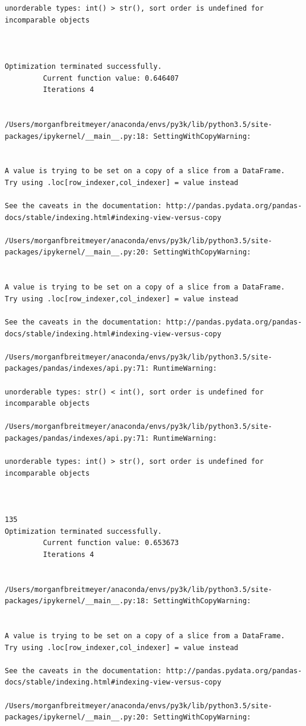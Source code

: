 \begin{lstlisting}
unorderable types: int() > str(), sort order is undefined for incomparable objects



Optimization terminated successfully.
         Current function value: 0.646407
         Iterations 4


/Users/morganfbreitmeyer/anaconda/envs/py3k/lib/python3.5/site-packages/ipykernel/__main__.py:18: SettingWithCopyWarning:


A value is trying to be set on a copy of a slice from a DataFrame.
Try using .loc[row_indexer,col_indexer] = value instead

See the caveats in the documentation: http://pandas.pydata.org/pandas-docs/stable/indexing.html#indexing-view-versus-copy

/Users/morganfbreitmeyer/anaconda/envs/py3k/lib/python3.5/site-packages/ipykernel/__main__.py:20: SettingWithCopyWarning:


A value is trying to be set on a copy of a slice from a DataFrame.
Try using .loc[row_indexer,col_indexer] = value instead

See the caveats in the documentation: http://pandas.pydata.org/pandas-docs/stable/indexing.html#indexing-view-versus-copy

/Users/morganfbreitmeyer/anaconda/envs/py3k/lib/python3.5/site-packages/pandas/indexes/api.py:71: RuntimeWarning:

unorderable types: str() < int(), sort order is undefined for incomparable objects

/Users/morganfbreitmeyer/anaconda/envs/py3k/lib/python3.5/site-packages/pandas/indexes/api.py:71: RuntimeWarning:

unorderable types: int() > str(), sort order is undefined for incomparable objects



135
Optimization terminated successfully.
         Current function value: 0.653673
         Iterations 4


/Users/morganfbreitmeyer/anaconda/envs/py3k/lib/python3.5/site-packages/ipykernel/__main__.py:18: SettingWithCopyWarning:


A value is trying to be set on a copy of a slice from a DataFrame.
Try using .loc[row_indexer,col_indexer] = value instead

See the caveats in the documentation: http://pandas.pydata.org/pandas-docs/stable/indexing.html#indexing-view-versus-copy

/Users/morganfbreitmeyer/anaconda/envs/py3k/lib/python3.5/site-packages/ipykernel/__main__.py:20: SettingWithCopyWarning:



\end{lstlisting}
